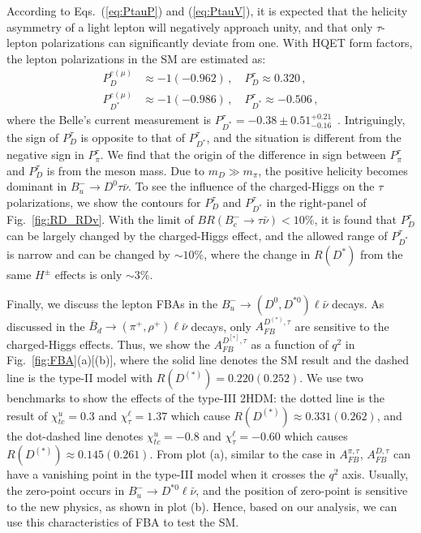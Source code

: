 \documentclass[prd,preprint,superscriptaddress,amsmath,amssymb]{revtex4}
\begin{document}
 According to Eqs.~(\ref{eq:PtauP}) and (\ref{eq:PtauV}), it is expected that the  helicity asymmetry of a light lepton will  negatively approach unity, and that only $\tau$-lepton polarizations can  significantly deviate  from one. With HQET form factors, the lepton polarizations 
 in the SM are estimated as:
  \begin{align}
  P^{e(\mu)}_D & \approx -1 (-0.962) \,, \quad P^{\tau}_D  \approx  0.320\,, \nonumber \\
  P^{e(\mu)}_{D^*} & \approx -1 ( -0.986)\,, \quad P^{\tau}_{D^*} \approx -0.506\,,
  \end{align}
where the Belle's current measurement is $P^\tau_{D^*}=-0.38\pm 0.51^{+0.21}_{-0.16}$~\cite{Hirose:2016wfn}. Intriguingly, the sign of $P^{\tau}_{D}$ is opposite to that of $P^{\tau}_{D^*}$, and  the situation is different from the negative sign in $P^{\tau}_{\pi}$.  We find that the origin of the difference in sign between $P^{\tau}_{\pi}$ and $P^{\tau}_{D}$ is from the meson mass.  Due to $m_D \gg m_\pi$, the positive helicity becomes dominant in $B^-_u \to D^0 \tau \bar\nu$. To see the influence of the charged-Higgs on the $\tau$ polarizations, we show the contours for $P^\tau_D$ and $P^\tau_{D^*}$ in the right-panel of Fig.~\ref{fig:RD_RDv}.  With the limit of $BR(B^-_c \to \tau \bar \nu) < 10\%$,  it is found that $P^\tau_D$ can be largely changed by the charged-Higgs effect, and the allowed range of $P^\tau_{D^*}$ is narrow and can be changed by $\sim 10\%$, where the change  in $R(D^*)$ from the same $H^\pm$ effects is only $\sim 3\%$. 
  
  

  
 Finally, we discuss the lepton FBAs in the $B^-_u \to (D^0, D^{*0})\ell \bar\nu$ decays. As discussed in the $\bar B_d \to ( \pi^+, \rho^+) \ell \bar\nu$ decays, only $A^{D^{(*)},\tau}_{FB}$ are sensitive to the charged-Higgs effects. Thus, we show the $A^{D^{[*]}, \tau}_{FB}$ as a function of $q^2$ in Fig.~\ref{fig:FBA}(a)[(b)], where the solid line denotes the SM result and  the dashed line is the type-II model with $R(D^{(*)})=0.220(0.252)$. We use two benchmarks to show the effects of the type-III 2HDM:  the dotted line  is   the result of $\chi^u_{tc}=0.3$ and  $\chi^\ell_\tau=1.37$ which cause  $R(D^{(*)}) \approx 0.331 (0.262)$, and the dot-dashed line denotes $\chi^u_{tc}=-0.8$ and  $\chi^\ell_\tau=-0.60$ which causes $R(D^{(*)}) \approx 0.145 (0.261)$. From plot (a), similar to the case in $A^{\pi,\tau}_{FB}$, $A^{D,\tau}_{FB}$ can have a vanishing point  in the type-III model when it crosses the $q^2$ axis. Usually,   the zero-point occurs in $B^-_u \to D^{*0} \ell \bar\nu$, and the position of zero-point is sensitive to the new physics, as shown in plot (b). Hence, based on our analysis, we can use this characteristics of FBA  to test the SM.   
  
\end{document}
